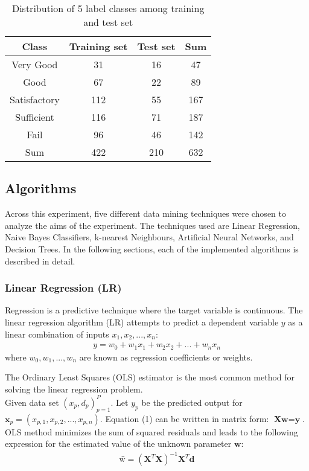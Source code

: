 	    \begin{table}[h]
	        \centering
	        \begin{tabular}{cccc}
	        \hline
	            Class &  Training set & Test set & Sum\\ \hline
	            Very Good & 31  & 16 & 47 \\
	            Good & 67 & 22 & 89 \\
	            Satisfactory & 112  & 55 & 167 \\
	            Sufficient & 116 & 71 & 187 \\
	            Fail & 96  & 46 & 142 \\ \hline
	            Sum & 422 & 210 & 632 \\
	            \hline
	        \end{tabular}
	        \caption{Distribution of 5 label classes among training and test set}
	        \label{tab:multiClassDistribution}
	    \end{table}

	\subsection{Algorithms}
	Across this experiment, five different data mining techniques were chosen to analyze the aims of the experiment. The techniques used are Linear Regression, Naive Bayes Classifiers, k-nearest Neighbours, Artificial Neural Networks, and Decision Trees. In the following sections, each of the implemented algorithms is described in detail.
	
	\subsubsection{Linear Regression (LR)}
	Regression is a predictive technique where the target variable is continuous. The linear regression algorithm (LR) attempts to predict a dependent variable \(y\) as a linear combination of inputs \(x_1, x_2, ..., x_n\):
	\begin{align}
	y = w_0 + w_1x_1 + w_2x_2 + ... + w_nx_n
	\end{align}
	where \(w_0, w_1, ..., w_n\) are known as regression coefficients or weights.

	
	The Ordinary Least Squares (OLS) estimator is the most common method for solving the linear regression problem.
	\\
	Given data set \({(x_p, d_p)}^P_{p=1}\). Let \(y_p\) be the predicted output for \(\textbf{x}_p = (x_{p,1}, x_{p,2}, ..., x_{p,n})\). Equation (1) can be written in matrix form: \(\textbf{Xw} = \textbf{y}\).
	OLS method minimizes the sum of squared residuals and leads to the following expression for the estimated value of the unknown parameter \(\textbf{w}\):
	\begin{align}
	\textbf{ŵ} = (\textbf{X}^T\textbf{X})^{-1}\textbf{X}^T\textbf{d}
	\end{align}

